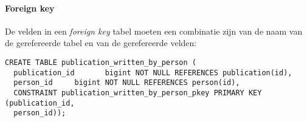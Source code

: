\paragraph{Foreign key}
De velden in een \textit{foreign key} tabel moeten een combinatie zijn van de naam van de gerefereerde tabel en van de gerefereerde velden:
\begin{lstlisting}
CREATE TABLE publication_written_by_person (
  publication_id       bigint NOT NULL REFERENCES publication(id),
  person_id     bigint NOT NULL REFERENCES person(id),
  CONSTRAINT publication_written_by_person_pkey PRIMARY KEY (publication_id,
  person_id));
\end{lstlisting}

